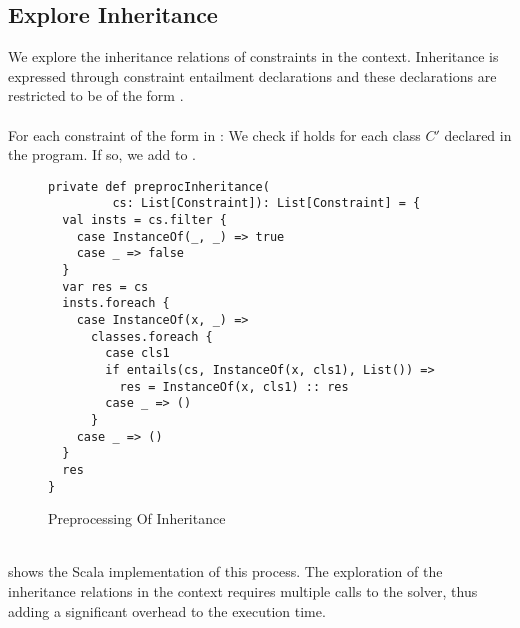 \subsection{Explore Inheritance}
We explore the inheritance relations
of constraints in the context.
Inheritance is expressed through constraint entailment declarations
and these declarations are restricted to be of the form
.\\
\\
For each constraint of the form  in :
We check if 
holds for each class $C'$ declared in the program.
If so, we add  to .
%
\begin{figure}[h]
\begin{lstlisting}
private def preprocInheritance(
         cs: List[Constraint]): List[Constraint] = {
  val insts = cs.filter {
    case InstanceOf(_, _) => true
    case _ => false
  }
  var res = cs
  insts.foreach {
    case InstanceOf(x, _) =>
      classes.foreach {
        case cls1
        if entails(cs, InstanceOf(x, cls1), List()) =>
          res = InstanceOf(x, cls1) :: res
        case _ => ()
      }
    case _ => ()
  }
  res
}
\end{lstlisting}
\caption{Preprocessing Of Inheritance}
\label{fig:scala-preproc-inheritance}
\end{figure}\\
%
 shows the
Scala implementation of this process.
The exploration of the inheritance relations
in the context requires multiple calls to the solver,
thus adding a significant overhead to the execution time.

